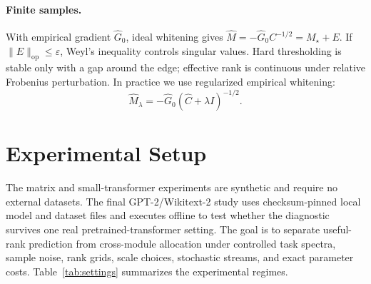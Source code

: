 \documentclass[10pt,twocolumn]{article}
\theoremstyle{definition}
\newcommand{\op}{\mathrm{op}}
\newcommand{\Mstar}{M_\star}
\newcommand{\Mhat}{\widehat M}
\begin{document}
\paragraph{Finite samples.}
With empirical gradient $\widehat G_0$, ideal whitening gives $\Mhat=-\widehat G_0C^{-1/2}=\Mstar+E$.  If $\|E\|_{\op}\le\varepsilon$, Weyl's inequality controls singular values.  Hard thresholding is stable only with a gap around the edge; effective rank is continuous under relative Frobenius perturbation.  In practice we use regularized empirical whitening:
\begin{equation}
    \widehat M_\lambda=-\widehat G_0(\widehat C+\lambda I)^{-1/2}.
\end{equation}

\section{Experimental Setup}
\label{sec:setup}

The matrix and small-transformer experiments are synthetic and require no external datasets.  The final GPT-2/Wikitext-2 study uses checksum-pinned local model and dataset files and executes offline to test whether the diagnostic survives one real pretrained-transformer setting.  The goal is to separate useful-rank prediction from cross-module allocation under controlled task spectra, sample noise, rank grids, scale choices, stochastic streams, and exact parameter costs.  Table~\ref{tab:settings} summarizes the experimental regimes.
\end{document}
